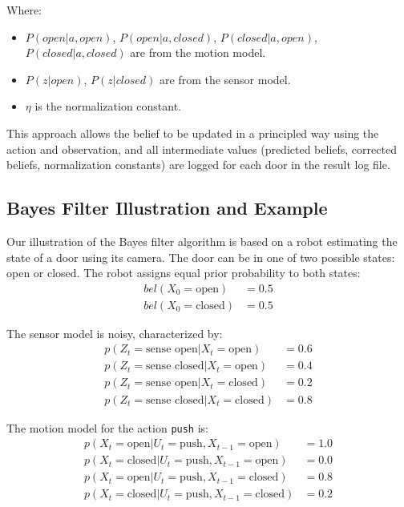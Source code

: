 \documentclass[12pt]{article}
\begin{document}
Where:
\begin{itemize}
  \item $P(open|a,open)$, $P(open|a,closed)$, $P(closed|a,open)$, $P(closed|a,closed)$ are from the motion model.
  \item $P(z|open)$, $P(z|closed)$ are from the sensor model.
  \item $\eta$ is the normalization constant.
\end{itemize}

This approach allows the belief to be updated in a principled way using the action and observation, and all intermediate values (predicted beliefs, corrected beliefs, normalization constants) are logged for each door in the result log file.
\subsection{Bayes Filter Illustration and Example}
Our illustration of the Bayes filter algorithm is based on a robot estimating the state of a door using its camera. The door can be in one of two possible states: open or closed. The robot assigns equal prior probability to both states:
\begin{align}
    bel(X_0 = \text{open}) &= 0.5 \\
    bel(X_0 = \text{closed}) &= 0.5
\end{align}

The sensor model is noisy, characterized by:
\begin{align}
    p(Z_t = \text{sense open} | X_t = \text{open}) &= 0.6 \\
    p(Z_t = \text{sense closed} | X_t = \text{open}) &= 0.4 \\
    p(Z_t = \text{sense open} | X_t = \text{closed}) &= 0.2 \\
    p(Z_t = \text{sense closed} | X_t = \text{closed}) &= 0.8
\end{align}

The motion model for the action \texttt{push} is:
\begin{align}
    p(X_t = \text{open} | U_t = \text{push}, X_{t-1} = \text{open}) &= 1.0 \\
    p(X_t = \text{closed} | U_t = \text{push}, X_{t-1} = \text{open}) &= 0.0 \\
    p(X_t = \text{open} | U_t = \text{push}, X_{t-1} = \text{closed}) &= 0.8 \\
    p(X_t = \text{closed} | U_t = \text{push}, X_{t-1} = \text{closed}) &= 0.2
\end{align}
\end{document}
